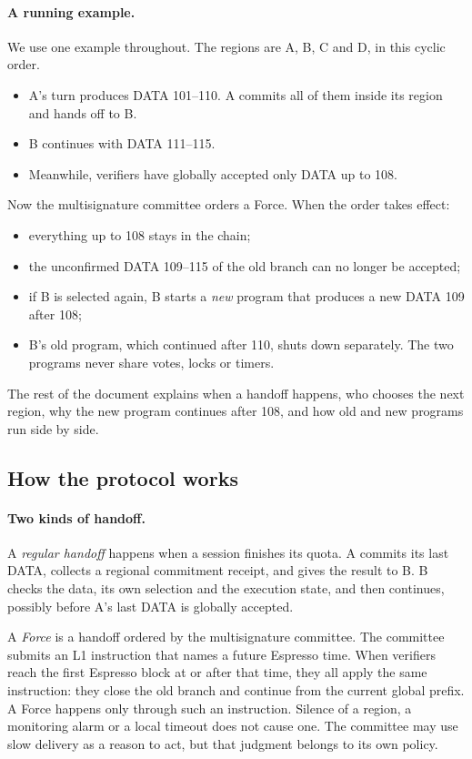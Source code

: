 \documentclass[11pt,a4paper]{article}
\newcommand{\defterm}[1]{\textcolor{rrBlue}{\textit{#1}}}
\newcounter{protocol}
\begin{document}
\paragraph{A running example.}
We use one example throughout. The regions are A, B, C and D, in this
cyclic order.
\begin{itemize}
\item A's turn produces DATA 101--110. A commits all of them inside its
region and hands off to B.
\item B continues with DATA 111--115.
\item Meanwhile, verifiers have globally accepted only DATA up to 108.
\end{itemize}
Now the multisignature committee orders a Force. When the order takes
effect:
\begin{itemize}
\item everything up to 108 stays in the chain;
\item the unconfirmed DATA 109--115 of the old branch can no longer be
accepted;
\item if B is selected again, B starts a \emph{new} program that produces
a new DATA 109 after 108;
\item B's old program, which continued after 110, shuts down separately.
The two programs never share votes, locks or timers.
\end{itemize}
The rest of the document explains when a handoff happens, who chooses
the next region, why the new program continues after 108, and how old
and new programs run side by side.

\subsection{How the protocol works}
\paragraph{Two kinds of handoff.}
A \defterm{regular handoff} happens when a session finishes its quota.
A commits its last DATA, collects a regional commitment receipt, and
gives the result to B. B checks the data, its own selection and the
execution state, and then continues, possibly before A's last
DATA is globally accepted.

A \defterm{Force} is a handoff ordered by the multisignature committee.
The committee submits an L1 instruction that names a future Espresso
time. When verifiers reach the first Espresso block at or after that
time, they all apply the same instruction: they close the old branch
and continue from the current global prefix. A Force happens only
through such an instruction. Silence of a region, a monitoring alarm or
a local timeout does not cause one. The committee may use slow delivery
as a reason to act, but that judgment belongs to its own policy.
\end{document}
